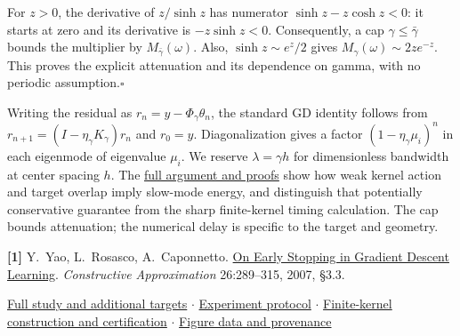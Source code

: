 \documentclass[10pt]{article}
\newcommand{\repo}{https://github.com/samlayton99/precision-mlps/blob/experiment/frozen-gamma-probe}
\newcommand{\evidence}{\repo/results/checkpoint_D_optimizers/expD36_frozen_gamma_probe/full_sweep/refinements/gamma_factorized_kernel}
\begin{document}
For $z>0$, the derivative of $z/\sinh z$ has numerator $\sinh z-z\cosh z<0$:
it starts at zero and its derivative is $-z\sinh z<0$. Consequently, a cap
$\gamma\le\bar\gamma$ bounds the multiplier by $M_{\bar\gamma}(\omega)$.
Also, $\sinh z\sim e^z/2$ gives $M_\gamma(\omega)\sim2ze^{-z}$.
This proves the explicit attenuation and its dependence on gamma, with no
periodic assumption.\hfill$\square$

Writing the residual as $r_n=y-\Phi_\gamma\theta_n$, the standard GD identity
follows from $r_{n+1}=(I-\eta_\gamma K_\gamma)r_n$ and
$r_0=y$. Diagonalization gives a factor $(1-\eta_\gamma\mu_i)^n$ in each
eigenmode of eigenvalue $\mu_i$. We reserve $\lambda=\gamma h$ for dimensionless
bandwidth at center spacing $h$. The
\href{\repo/docs/gamma_optimization_full_note.pdf}{full argument and proofs}
show how weak kernel action and target overlap imply slow-mode energy, and
distinguish that potentially conservative guarantee from the sharp finite-kernel
timing calculation. The cap bounds attenuation; the numerical delay is specific
to the target and geometry.

\bigskip
{\small
\textbf{[1]} Y.~Yao, L.~Rosasco, A.~Caponnetto.
\href{https://yao-lab.github.io/publications/YaoCapRos07_EarlyStop.pdf}{On Early
Stopping in Gradient Descent Learning}. \textit{Constructive Approximation}
26:289--315, 2007, \S3.3.\par
\href{\repo/docs/gamma_optimization_paper_note.pdf}{Full study and additional targets}
\enspace$\cdot$\enspace
\href{\repo/results/checkpoint_D_optimizers/expD36_frozen_gamma_probe/full_sweep/REPORT.md}{Experiment protocol}
\enspace$\cdot$\enspace
\href{\repo/docs/gamma_factorized_readout.md}{Finite-kernel construction and certification}
\enspace$\cdot$\enspace
\href{\evidence/pi_brief_figure_data.json}{Figure data and provenance}}
\end{document}
